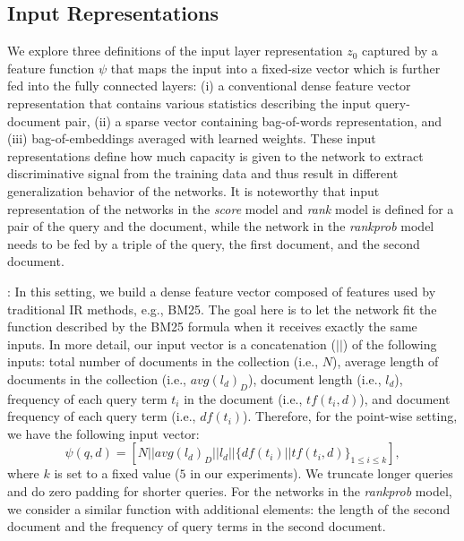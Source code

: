 \documentclass[sigconf]{acmart}
\newcommand{\modelone}{\textit{score} model\xspace}
\newcommand{\modeltwo}{\textit{rank} model\xspace}
\newcommand{\modelthree}{\textit{rank\-prob} model\xspace}
\newcommand{\Feedone}{Dense vector representation\xspace}
\newcommand{\fone}{Dense\xspace}
\begin{document}
\subsection{Input Representations}
\label{sec:feedings}
We explore three definitions of the input layer representation $z_0$ captured by a feature function $\psi$ that maps the input into a fixed-size vector which is further fed into the fully connected layers: 
(i) a conventional dense feature vector representation that contains various statistics describing the input query-document pair, 
(ii) a sparse vector containing bag-of-words representation, and 
(iii) bag-of-embeddings averaged with learned weights. 
These input representations define how much capacity is given to the network to extract discriminative signal from the training data and thus result in different generalization behavior of the networks. 
It is noteworthy that input representation of the networks in the \modelone and \modeltwo is defined for a pair of the query and the document, while the network in the \modelthree needs to be fed by a triple of the query, the first document, and the second document.

\mypar{\Feedone (\fone)}: 
In this setting, we build a dense feature vector composed of features used by traditional IR methods, e.g., BM25. The goal here is to let the network fit the function described by the BM25 formula when it receives exactly the same inputs. 
In more detail, our input vector is a concatenation ($||$) of the following inputs: total number of documents in the collection (i.e., $N$), average length of documents in the collection (i.e., $avg(l_d)_D$), document length (i.e., $l_d$), frequency of each query term $t_i$ in the document (i.e., $tf(t_i, d)$), and document frequency of each query term (i.e., $df(t_i)$). Therefore, for the point-wise setting, we have the following input vector:
\begin{equation}
\psi(q, d) = [N || avg(l_d)_D || l_d || \{df(t_i) || tf(t_i,d)\}_{1 \leq i \leq k}],
\end{equation}
where $k$ is set to a fixed value ($5$ in our experiments). 
We truncate longer queries and do zero padding for shorter queries. 
For the networks in the \modelthree, we consider a similar function with additional elements: the length of the second document and the frequency of query terms in the second document.
\end{document}
